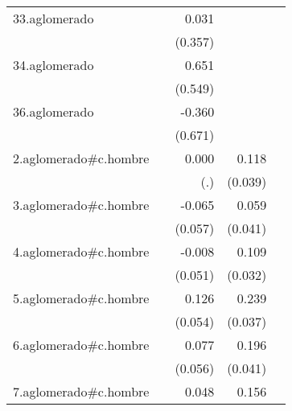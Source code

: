 {\begin{longtable}{l*{4}{D{.}{.}{-1}}}
\addlinespace
33.aglomerado&                     &       0.031         &                     &                     \\
            &                     &     (0.357)         &                     &                     \\
\addlinespace
34.aglomerado&                     &       0.651         &                     &                     \\
            &                     &     (0.549)         &                     &                     \\
\addlinespace
36.aglomerado&                     &      -0.360         &                     &                     \\
            &                     &     (0.671)         &                     &                     \\
\addlinespace
2.aglomerado#c.hombre&                     &       0.000         &       0.118\sym{**} &                     \\
            &                     &         (.)         &     (0.039)         &                     \\
\addlinespace
3.aglomerado#c.hombre&                     &      -0.065         &       0.059         &                     \\
            &                     &     (0.057)         &     (0.041)         &                     \\
\addlinespace
4.aglomerado#c.hombre&                     &      -0.008         &       0.109\sym{***}&                     \\
            &                     &     (0.051)         &     (0.032)         &                     \\
\addlinespace
5.aglomerado#c.hombre&                     &       0.126\sym{*}  &       0.239\sym{***}&                     \\
            &                     &     (0.054)         &     (0.037)         &                     \\
\addlinespace
6.aglomerado#c.hombre&                     &       0.077         &       0.196\sym{***}&                     \\
            &                     &     (0.056)         &     (0.041)         &                     \\
\addlinespace
7.aglomerado#c.hombre&                     &       0.048         &       0.156\sym{***}&                     \\

\end{longtable}}
